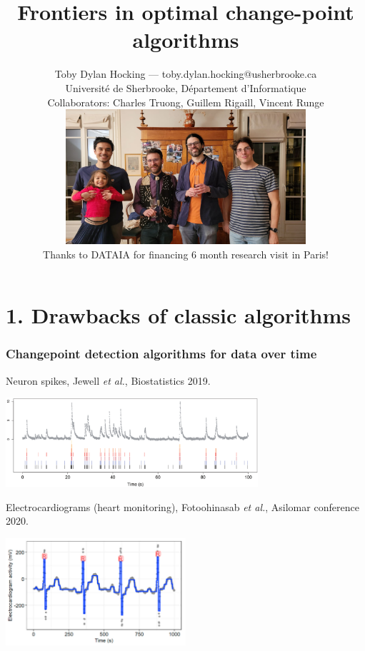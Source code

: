 \documentclass{beamer}
\begin{document}
\title{
  Frontiers in optimal change-point algorithms
}

\author{
  Toby Dylan Hocking --- toby.dylan.hocking@usherbrooke.ca\\ 
  Université de Sherbrooke, Département d'Informatique\\
  Collaborators: Charles Truong, Guillem Rigaill, Vincent Runge\\
  \includegraphics[height=5cm]{2025-01-photo-charles-toby-guillem-vincent.jpg}\\
  Thanks to DATAIA for financing 6 month research visit in Paris!
}

\date{}

\maketitle

\section{1. Drawbacks of classic algorithms} 
\begin{frame}
  \frametitle{Changepoint detection algorithms for data over time}
  Neuron spikes, Jewell \emph{et al.}, Biostatistics 2019.

  \includegraphics[width=0.7\textwidth]{intro-neuroscience} 

  Electrocardiograms (heart monitoring), 
  Fotoohinasab \emph{et al.}, 
  Asilomar conference 2020.

  \includegraphics[width=0.5\textwidth]{intro-ecg} 

\end{frame}
\end{document}
